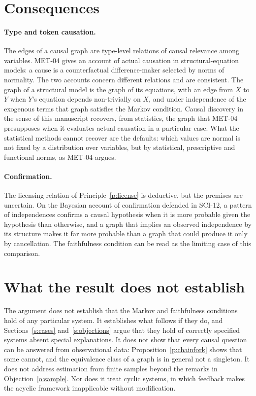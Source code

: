 \documentclass{situationist-preprint}
\begin{document}
\section{Consequences}\label{s:consequences}

\paragraph{Type and token causation.} The edges of a causal graph are type-level relations of causal relevance among variables. MET-04 gives an account of actual causation in structural-equation models: a cause is a counterfactual difference-maker selected by norms of normality. The two accounts concern different relations and are consistent. The graph of a structural model is the graph of its equations, with an edge from $X$ to $Y$ when $Y$'s equation depends non-trivially on $X$, and under independence of the exogenous terms that graph satisfies the Markov condition. Causal discovery in the sense of this manuscript recovers, from statistics, the graph that MET-04 presupposes when it evaluates actual causation in a particular case. What the statistical methods cannot recover are the defaults: which values are normal is not fixed by a distribution over variables, but by statistical, prescriptive and functional norms, as MET-04 argues.

\paragraph{Confirmation.} The licensing relation of Principle~\ref{p:license} is deductive, but the premises are uncertain. On the Bayesian account of confirmation defended in SCI-12, a pattern of independences confirms a causal hypothesis when it is more probable given the hypothesis than otherwise, and a graph that implies an observed independence by its structure makes it far more probable than a graph that could produce it only by cancellation. The faithfulness condition can be read as the limiting case of this comparison.

\section{What the result does not establish}\label{s:limits}

The argument does not establish that the Markov and faithfulness conditions hold of any particular system. It establishes what follows if they do, and Sections~\ref{s:cases} and~\ref{s:objections} argue that they hold of correctly specified systems absent special explanations. It does not show that every causal question can be answered from observational data: Proposition~\ref{p:chainfork} shows that some cannot, and the equivalence class of a graph is in general not a singleton. It does not address estimation from finite samples beyond the remarks in Objection~\ref{o:sample}. Nor does it treat cyclic systems, in which feedback makes the acyclic framework inapplicable without modification.
\end{document}
